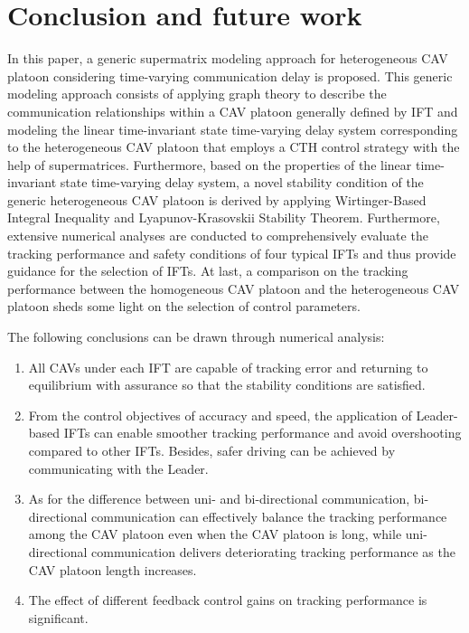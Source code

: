 \documentclass[a4paper]{cas-sc}
\begin{document}
\section{Conclusion and future work}
\label{Section 6}

In this paper, a generic supermatrix modeling approach for heterogeneous CAV platoon considering time-varying communication delay is proposed. This generic modeling approach consists of applying graph theory to describe the communication relationships within a CAV platoon generally defined by IFT and modeling the linear time-invariant state time-varying delay system corresponding to the heterogeneous CAV platoon that employs a CTH control strategy with the help of supermatrices. Furthermore, based on the properties of the linear time-invariant state time-varying delay system, a novel stability condition of the generic heterogeneous CAV platoon is derived by applying Wirtinger-Based Integral Inequality and Lyapunov-Krasovskii Stability Theorem. Furthermore, extensive numerical analyses are conducted to comprehensively evaluate the tracking performance and safety conditions of four typical IFTs and thus provide guidance for the selection of IFTs. At last, a comparison on the tracking performance between the homogeneous CAV platoon and the heterogeneous CAV platoon sheds some light on the selection of control parameters.

The following conclusions can be drawn through numerical analysis:
\begin{enumerate}
  \item All CAVs under each IFT are capable of tracking error and returning to equilibrium with assurance so that the stability conditions are satisfied.
  \item From the control objectives of accuracy and speed, the application of Leader-based IFTs can enable smoother tracking performance and avoid overshooting compared to other IFTs. Besides, safer driving can be achieved by communicating with the Leader.
  \item As for the difference between uni- and bi-directional communication, bi-directional communication can effectively balance the tracking performance among the CAV platoon even when the CAV platoon is long, while uni-directional communication delivers deteriorating tracking performance as the CAV platoon length increases.
  \item The effect of different feedback control gains on tracking performance is significant.
\end{enumerate}
\end{document}
